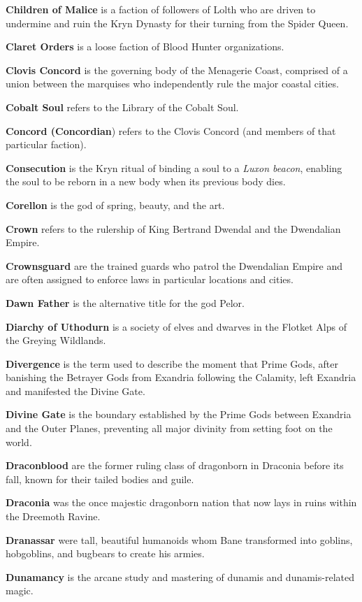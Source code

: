 \documentclass[10pt,a4paper,twoside,bg=print,twocolumn,openany,nodeprecatedcode]{dndbook}
\begin{document}
\textbf{Children of Malice} is a faction of followers of Lolth who are driven to undermine and ruin the Kryn Dynasty for their turning from the Spider Queen.

\textbf{Claret Orders} is a loose faction of Blood Hunter organizations.

\textbf{Clovis Concord} is the governing body of the Menagerie Coast, comprised of a union between the marquises who independently rule the major coastal cities.

\textbf{Cobalt Soul} refers to the Library of the Cobalt Soul.

\textbf{Concord (Concordian}) refers to the Clovis Concord (and members of that particular faction).

\textbf{Consecution} is the Kryn ritual of binding a soul to a \textit{Luxon beacon}, enabling the soul to be reborn in a new body when its previous body dies.

\textbf{Corellon} is the god of spring, beauty, and the art.

\textbf{Crown} refers to the rulership of King Bertrand Dwendal and the Dwendalian Empire.

\textbf{Crownsguard} are the trained guards who patrol the Dwendalian Empire and are often assigned to enforce laws in particular locations and cities.

\textbf{Dawn Father} is the alternative title for the god Pelor.

\textbf{Diarchy of Uthodurn} is a society of elves and dwarves in the Flotket Alps of the Greying Wildlands.

\textbf{Divergence} is the term used to describe the moment that Prime Gods, after banishing the Betrayer Gods from Exandria following the Calamity, left Exandria and manifested the Divine Gate.

\textbf{Divine Gate} is the boundary established by the Prime Gods between Exandria and the Outer Planes, preventing all major divinity from setting foot on the world.

\textbf{Draconblood} are the former ruling class of dragonborn in Draconia before its fall, known for their tailed bodies and guile.

\textbf{Draconia} was the once majestic dragonborn nation that now lays in ruins within the Dreemoth Ravine.

\textbf{Dranassar} were tall, beautiful humanoids whom Bane transformed into goblins, hobgoblins, and bugbears to create his armies.

\textbf{Dunamancy} is the arcane study and mastering of dunamis and dunamis-related magic.
\end{document}
